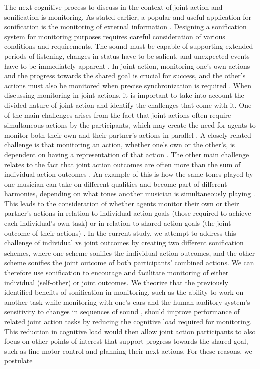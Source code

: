 \documentclass[10pt,a4paper,onecolumn]{article}
\begin{document}
The next cognitive process to discuss in the context of joint action and sonification is monitoring. As stated earlier, a popular and useful application for sonification is the monitoring of external information \autocite{dubusSystematicReviewMapping2013}. Designing a sonification system for monitoring purposes requires careful consideration of various conditions and requirements. The sound must be capable of supporting extended periods of listening, changes in status have to be salient, and unexpected events have to be immediately apparent \autocite{kimotoDesignImplementationStetho2002}. In joint action, monitoring one's own actions and the progress towards the shared goal is crucial for success, and the other's actions must also be monitored when precise synchronization is required \autocite{vesperMinimalArchitectureJoint2010}. When discussing monitoring in joint actions, it is important to take into account the divided nature of joint action and identify the challenges that come with it. One of the main challenges arises from the fact that joint actions often require simultaneous actions by the participants, which may create the need for agents to monitor both their own and their partner's actions in parallel \autocite{loehrMonitoringIndividualJoint2013}. A closely related challenge is that monitoring an action, whether one's own or the other's, is dependent on having a representation of that action \autocite{knoblichPsychologicalResearchJoint2011}. The other main challenge relates to the fact that joint action outcomes are often more than the sum of individual action outcomes \autocite{loehrMonitoringIndividualJoint2013}. An example of this is how the same tones played by one musician can take on different qualities and become part of different harmonies, depending on what tones another musician is simultaneously playing \autocite{loehrMonitoringIndividualJoint2013}. This leads to the consideration of whether agents monitor their own or their partner's actions in relation to individual action goals (those required to achieve each individual's own task) or in relation to shared action goals (the joint outcome of their actions) \autocite{loehrMonitoringIndividualJoint2013}. In the current study, we attempt to address this challenge of individual vs joint outcomes by creating two different sonification schemes, where one scheme sonifies the individual action outcomes, and the other scheme sonifies the joint outcome of both participants' combined actions. We can therefore use sonification to encourage and facilitate monitoring of either individual (self-other) or joint outcomes. We theorize that the previously identified benefits of sonification in monitoring, such as the ability to work on another task while monitoring with one's ears \autocite{vickersSonificationProcessMonitoring2011} and the human auditory system's sensitivity to changes in sequences of sound \autocite{hildebrandtShortPaperEnhancing2014}, should improve performance of related joint action tasks by reducing the cognitive load required for monitoring. This reduction in cognitive load would then allow joint action participants to also focus on other points of interest that support progress towards the shared goal, such as fine motor control and planning their next actions. For these reasons, we postulate 
\end{document}
